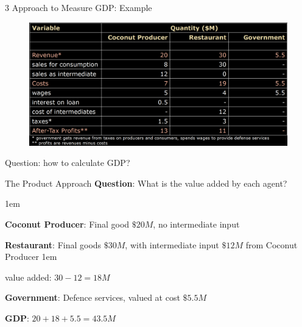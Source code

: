 \documentclass[11pt,aspectratio=43]{beamer}
\let\olditemize=\itemize
\let\endolditemize=\enditemize
\renewenvironment{itemize}{\olditemize \itemsep1em}{\endolditemize}
\theoremstyle{definition}
\begin{document}
\begin{frame}{$3$ Approach to Measure GDP: Example}
\label{slide:_3__Approach_to_Measure_GDP__Example}
    \begin{figure}
        \includegraphics[width=\textwidth]{./figures/ThreeApproachTable1.png}
    \end{figure}
    \alert{Question}: how to calculate GDP?
\end{frame}

\begin{frame}{The Product Approach}
\label{slide:The_Product_Approach}
\textbf{Question}: \alert{What is the value added by each agent?}

\begin{itemize}
    \item \textbf{Coconut Producer}: Final good $ \$20M $, no intermediate input
    \item \textbf{Restaurant}: Final goods $ \$30M $, with intermediate input $ \$12M $ from Coconut Producer
    \begin{itemize}
        \item value added: $ 30 - 12 = 18M $
    \end{itemize}
    \item \textbf{Government}: Defence services, valued at cost $ \$5.5M $
    \item \textbf{GDP}: $ 20 + 18 + 5.5 = 43.5M $
\end{itemize}
\end{frame}
\end{document}
